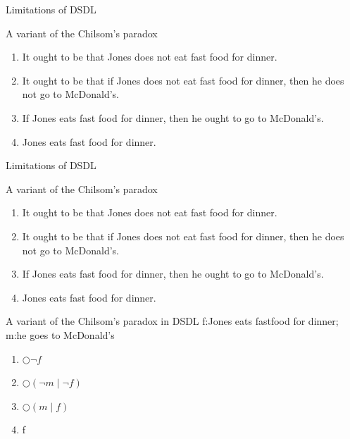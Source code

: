 \documentclass{beamer}
\begin{document}
\begin{frame}{Limitations of DSDL}
\begin{block}{A variant of the Chilsom's paradox}
\begin{enumerate}
\item[A]It ought to be that Jones does not eat fast food for dinner.
\item[B]It ought to be that if Jones does not eat fast food for dinner, then he does not go to McDonald’s.
\item[C] If Jones eats fast food for dinner, then he ought to go to McDonald’s.
\item[D]Jones eats fast food for dinner.
\end{enumerate}
\end{block}
\end{frame}
\begin{frame}{Limitations of DSDL}
\begin{block}{A variant of the Chilsom's paradox}
\begin{enumerate}
\item[A]It ought to be that Jones does not eat fast food for dinner.
\item[B]It ought to be that if Jones does not eat fast food for dinner, then he does not go to McDonald’s.
\item[C] If Jones eats fast food for dinner, then he ought to go to McDonald’s.
\item[D]Jones eats fast food for dinner.
\end{enumerate}
\end{block}
\begin{block}{A variant of the Chilsom's paradox in DSDL}
f:Jones eats fastfood for dinner; m:he goes to McDonald’s 
\begin{enumerate}
\item[A]$\bigcirc \neg f$
\item[B]$\bigcirc(\neg m \mid \neg f)$
\item[C]$\bigcirc(m\mid f)$
\item[D]f
\end{enumerate}
\end{block}
\end{frame}
\end{document}
